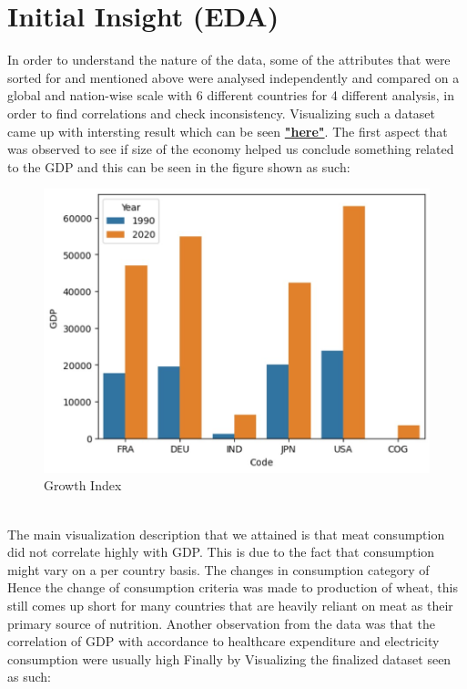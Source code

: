 \documentclass[conference]{IEEEtran}
\begin{document}
\section{Initial Insight (EDA)}
In order to understand the nature of the data, some of the attributes that were sorted for and mentioned above were analysed independently and compared on a global and nation-wise scale with 6 different countries for 4 different analysis, in order to find correlations and check inconsistency.
Visualizing such a dataset came up with intersting result which can be seen \textbf{\href{https://github.com/NeerajG03/Economic_Growth-Versus-Factors}{"here"}}.
The first aspect that was observed to see if size of the economy helped us conclude something related to the GDP and this can be seen in the figure shown as such:\\
\begin{figure}[htbp]
    \centerline{\includegraphics[scale=0.5]{eda1.jpg}}
    \caption{Growth Index}
\end{figure}
\\
The main visualization description that we attained is that meat consumption did not correlate highly with GDP.
This is due to the fact that consumption might vary on a per country basis.
The changes in consumption category of
Hence the change of consumption criteria was made to production of wheat, this still comes up short for many countries that are heavily reliant on meat as their primary source of nutrition.
Another observation from the data was that the correlation of GDP with accordance to healthcare expenditure and electricity consumption were usually high
Finally by Visualizing the finalized dataset seen as such:
\end{document}
